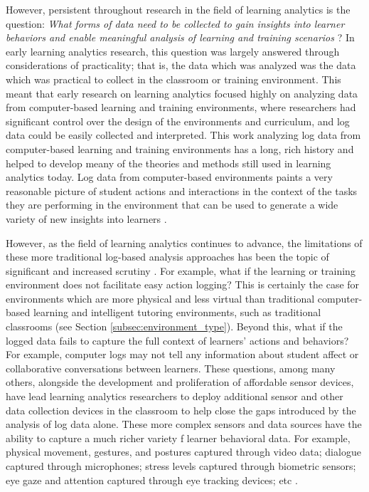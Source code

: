 \documentclass[manuscript,screen,review]{acmart}
\begin{document}
However, persistent throughout research in the field of learning analytics is the question: \textit{What forms of data need to be collected to gain insights into learner behaviors and enable meaningful analysis of learning and training scenarios} \cite{vatral2022using, ochoa2017multimodal}? In early learning analytics research, this question was largely answered through considerations of practicality; that is, the data which was analyzed was the data which was practical to collect in the classroom or training environment. This meant that early research on learning analytics focused highly on analyzing data from computer-based learning and training environments, where researchers had significant control over the design of the environments and curriculum, and log data could be easily collected and interpreted. This work analyzing log data from computer-based learning and training environments has a long, rich history and helped to develop meany of the theories and methods still used in learning analytics today. Log data from computer-based environments paints a very reasonable picture of student actions and interactions in the context of the tasks they are performing in the environment that can be used to generate a wide variety of new insights into learners \cite{hoppe2017computational, ochoa2017multimodal}. 

However, as the field of learning analytics continues to advance, the limitations of these more traditional log-based analysis approaches has been the topic of significant and increased scrutiny \cite{ochoa2017multimodal}. For example, what if the learning or training environment does not facilitate easy action logging? This is certainly the case for environments which are more physical and less virtual than traditional computer-based learning and intelligent tutoring environments, such as traditional classrooms (see Section \ref{subsec:environment_type}). Beyond this, what if the logged data fails to capture the full context of learners' actions and behaviors? For example, computer logs may not tell any information about student affect or collaborative conversations between learners. These questions, among many others, alongside the development and proliferation of affordable sensor devices, have lead learning analytics researchers to deploy additional sensor and other data collection devices in the classroom to help close the gaps introduced by the analysis of log data alone. These more complex sensors and data sources have the ability to capture a much richer variety f learner behavioral data. For example, physical movement, gestures, and postures captured through video data; dialogue captured through microphones; stress levels captured through biometric sensors; eye gaze and attention captured through eye tracking devices; etc \cite{vatral2022using}. 
\end{document}
